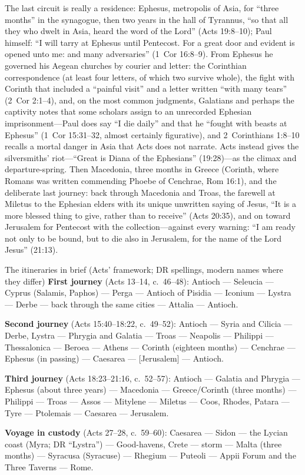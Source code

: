 The last circuit is really a residence: Ephesus, metropolis of Asia, for
``three months'' in the synagogue, then two years in the hall of Tyrannus,
``so that all they who dwelt in Asia, heard the word of the Lord'' (Acts
19:8--10); Paul himself: ``I will tarry at Ephesus until Pentecost. For a
great door and evident is opened unto me: and many adversaries'' (1~Cor
16:8--9). From Ephesus he governed his Aegean churches by courier and
letter: the Corinthian correspondence (at least four letters, of which two
survive whole), the fight with Corinth that included a ``painful visit''
and a letter written ``with many tears'' (2~Cor 2:1--4), and, on the most
common judgments, Galatians and perhaps the captivity notes that some
scholars assign to an unrecorded Ephesian imprisonment---Paul does say ``I
die daily'' and that he ``fought with beasts at Ephesus'' (1~Cor 15:31--32,
almost certainly figurative), and 2~Corinthians 1:8--10 recalls a mortal
danger in Asia that Acts does not narrate. Acts instead gives the
silversmiths' riot---``Great is Diana of the Ephesians'' (19:28)---as the
climax and departure-spring. Then Macedonia, three months in Greece
(Corinth, where Romans was written commending Phoebe of Cenchrae, Rom
16:1), and the deliberate last journey: back through Macedonia and Troas,
the farewell at Miletus to the Ephesian elders with its unique unwritten
saying of Jesus, ``It is a more blessed thing to give, rather than to
receive'' (Acts 20:35), and on toward Jerusalem for Pentecost with the
collection---against every warning: ``I am ready not only to be bound, but
to die also in Jerusalem, for the name of the Lord Jesus'' (21:13).

\begin{studybox}{The itineraries in brief (Acts' framework; DR spellings,
modern names where they differ)}
\small
\textbf{First journey} (Acts 13--14, c.~46--48): Antioch --- Seleucia ---
Cyprus (Salamis, Paphos) --- Perga --- Antioch of Pisidia --- Iconium ---
Lystra --- Derbe --- back through the same cities --- Attalia ---
Antioch.\par
\textbf{Second journey} (Acts 15:40--18:22, c.~49--52): Antioch --- Syria
and Cilicia --- Derbe, Lystra --- Phrygia and Galatia --- Troas ---
Neapolis --- Philippi --- Thessalonica --- Beroea --- Athens --- Corinth
(eighteen months) --- Cenchrae --- Ephesus (in passing) --- Caesarea ---
[Jerusalem] --- Antioch.\par
\textbf{Third journey} (Acts 18:23--21:16, c.~52--57): Antioch ---
Galatia and Phrygia --- Ephesus (about three years) --- Macedonia ---
Greece/Corinth (three months) --- Philippi --- Troas --- Assos ---
Mitylene --- Miletus --- Coos, Rhodes, Patara --- Tyre --- Ptolemais ---
Caesarea --- Jerusalem.\par
\textbf{Voyage in custody} (Acts 27--28, c.~59--60): Caesarea --- Sidon
--- the Lycian coast (Myra; DR ``Lystra'') --- Good-havens, Crete ---
storm --- Malta (three months) --- Syracusa (Syracuse) --- Rhegium ---
Puteoli --- Appii Forum and the Three Taverns --- Rome.
\end{studybox}
